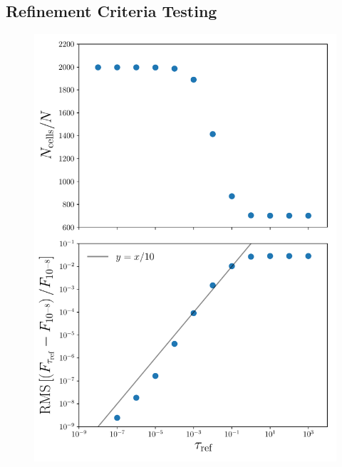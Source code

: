 \documentclass[fleq,usenatbib]{mnras}
\begin{document}
\subsection{Refinement Criteria Testing}
\begin{figure}
\includegraphics[width=1\linewidth]{Figures/refinement_criteria.pdf}
\caption{}
\label{fig:refcrit}
\end{figure}
\end{document}
